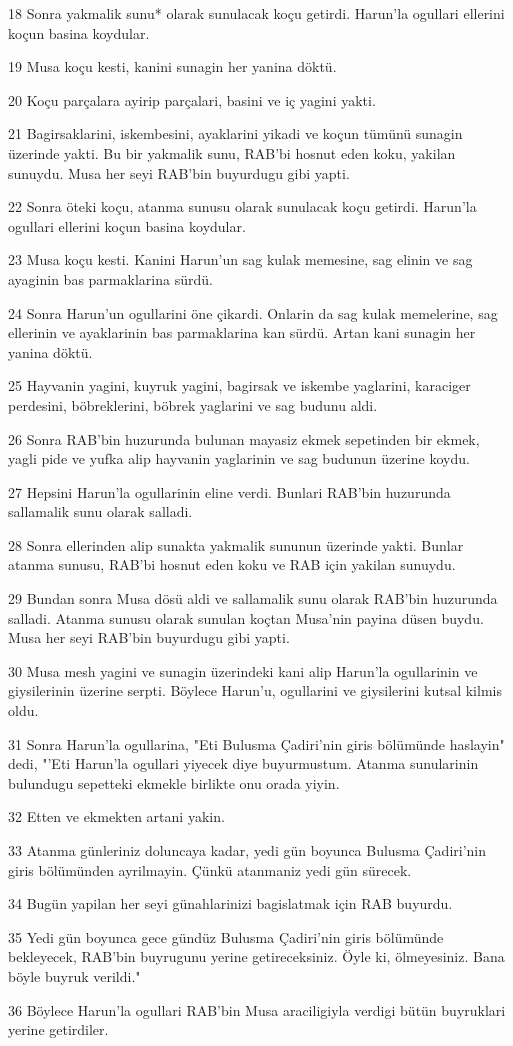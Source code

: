 \par 18 Sonra yakmalik sunu* olarak sunulacak koçu getirdi. Harun'la ogullari ellerini koçun basina koydular.
\par 19 Musa koçu kesti, kanini sunagin her yanina döktü.
\par 20 Koçu parçalara ayirip parçalari, basini ve iç yagini yakti.
\par 21 Bagirsaklarini, iskembesini, ayaklarini yikadi ve koçun tümünü sunagin üzerinde yakti. Bu bir yakmalik sunu, RAB'bi hosnut eden koku, yakilan sunuydu. Musa her seyi RAB'bin buyurdugu gibi yapti.
\par 22 Sonra öteki koçu, atanma sunusu olarak sunulacak koçu getirdi. Harun'la ogullari ellerini koçun basina koydular.
\par 23 Musa koçu kesti. Kanini Harun'un sag kulak memesine, sag elinin ve sag ayaginin bas parmaklarina sürdü.
\par 24 Sonra Harun'un ogullarini öne çikardi. Onlarin da sag kulak memelerine, sag ellerinin ve ayaklarinin bas parmaklarina kan sürdü. Artan kani sunagin her yanina döktü.
\par 25 Hayvanin yagini, kuyruk yagini, bagirsak ve iskembe yaglarini, karaciger perdesini, böbreklerini, böbrek yaglarini ve sag budunu aldi.
\par 26 Sonra RAB'bin huzurunda bulunan mayasiz ekmek sepetinden bir ekmek, yagli pide ve yufka alip hayvanin yaglarinin ve sag budunun üzerine koydu.
\par 27 Hepsini Harun'la ogullarinin eline verdi. Bunlari RAB'bin huzurunda sallamalik sunu olarak salladi.
\par 28 Sonra ellerinden alip sunakta yakmalik sununun üzerinde yakti. Bunlar atanma sunusu, RAB'bi hosnut eden koku ve RAB için yakilan sunuydu.
\par 29 Bundan sonra Musa dösü aldi ve sallamalik sunu olarak RAB'bin huzurunda salladi. Atanma sunusu olarak sunulan koçtan Musa'nin payina düsen buydu. Musa her seyi RAB'bin buyurdugu gibi yapti.
\par 30 Musa mesh yagini ve sunagin üzerindeki kani alip Harun'la ogullarinin ve giysilerinin üzerine serpti. Böylece Harun'u, ogullarini ve giysilerini kutsal kilmis oldu.
\par 31 Sonra Harun'la ogullarina, "Eti Bulusma Çadiri'nin giris bölümünde haslayin" dedi, "'Eti Harun'la ogullari yiyecek diye buyurmustum. Atanma sunularinin bulundugu sepetteki ekmekle birlikte onu orada yiyin.
\par 32 Etten ve ekmekten artani yakin.
\par 33 Atanma günleriniz doluncaya kadar, yedi gün boyunca Bulusma Çadiri'nin giris bölümünden ayrilmayin. Çünkü atanmaniz yedi gün sürecek.
\par 34 Bugün yapilan her seyi günahlarinizi bagislatmak için RAB buyurdu.
\par 35 Yedi gün boyunca gece gündüz Bulusma Çadiri'nin giris bölümünde bekleyecek, RAB'bin buyrugunu yerine getireceksiniz. Öyle ki, ölmeyesiniz. Bana böyle buyruk verildi."
\par 36 Böylece Harun'la ogullari RAB'bin Musa araciligiyla verdigi bütün buyruklari yerine getirdiler.

